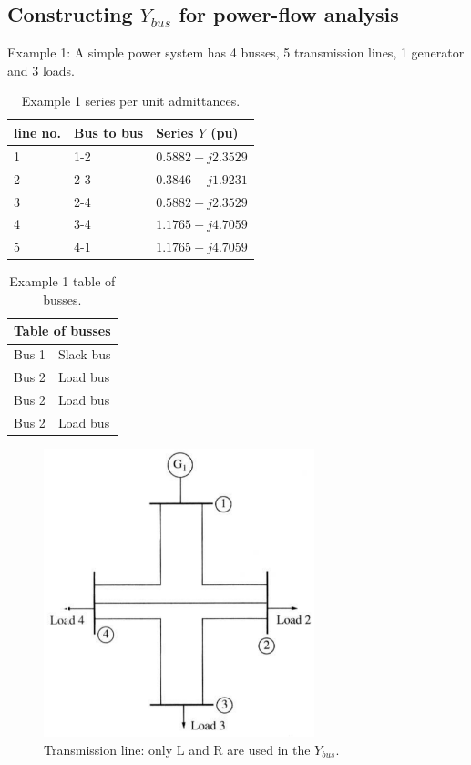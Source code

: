 \subsection{Constructing $Y_{bus}$ for power-flow analysis}
Example 1: A simple power system has 4 busses, 5 transmission lines, 1 generator and 3 loads.
\begin{table}[H]
	\centering
	\begin{tabular}{@{}lll@{}}
		\toprule
		\textbf{line no.} & \textbf{Bus to bus} & \textbf{Series $Y$ (pu)} \\
		\midrule
		1                 & 1-2                 & $0.5882 - j2.3529$       \\
		2                 & 2-3                 & $0.3846 - j1.9231$       \\
		3                 & 2-4                 & $0.5882 - j2.3529$       \\
		4                 & 3-4                 & $1.1765 - j4.7059$       \\
		5                 & 4-1                 & $1.1765 - j4.7059$       \\
		\bottomrule
	\end{tabular}
	\caption{Example 1 series per unit admittances.}
\end{table}
\begin{table}[H]
	\centering
	\begin{tabular}{@{}ll@{}}
		\toprule
		\multicolumn{2}{l}{\textbf{Table of busses}} \\
		\midrule
		Bus 1 & Slack bus                            \\
		Bus 2 & Load bus                             \\
		Bus 2 & Load bus                             \\
		Bus 2 & Load bus                             \\
		\bottomrule
	\end{tabular}
	\caption{Example 1 table of busses.}
\end{table}
\begin{figure}[H]
	\centering
	\includegraphics[width = 0.7\textwidth]{./img/figure50.png}
	\caption{Transmission line: only L and R are used in the $Y_{bus}$.}
\end{figure}
